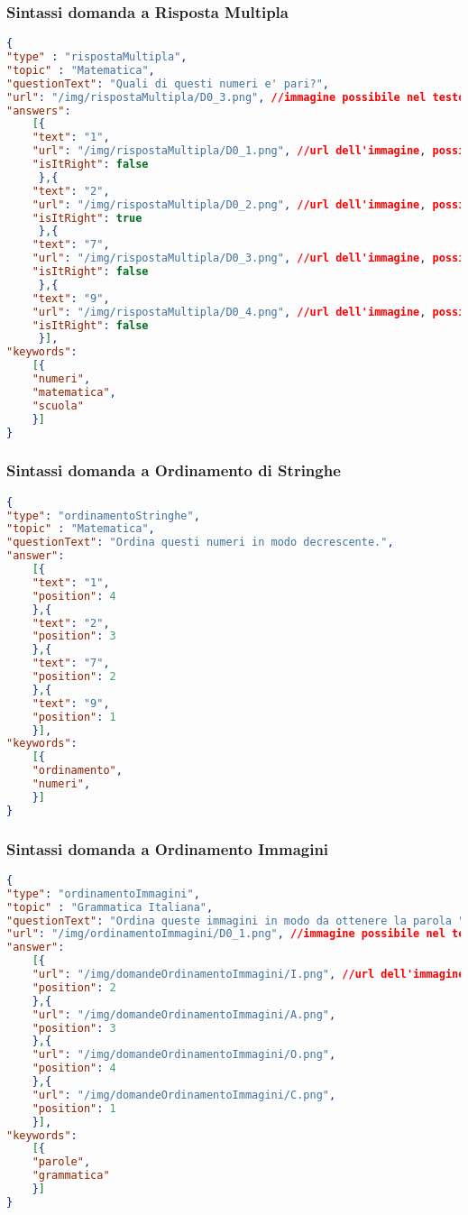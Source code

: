 \subsubsection{Sintassi domanda a Risposta Multipla}
\begin{lstlisting}[language=json,firstnumber=1]
{	
"type" : "rispostaMultipla",
"topic" : "Matematica",
"questionText": "Quali di questi numeri e' pari?",
"url": "/img/rispostaMultipla/D0_3.png", //immagine possibile nel testo della domanda risposta multipla
"answers":
	[{
	"text": "1",
	"url": "/img/rispostaMultipla/D0_1.png", //url dell'immagine, possibile campo facoltativo
	"isItRight": false
	 },{
	"text": "2",
	"url": "/img/rispostaMultipla/D0_2.png", //url dell'immagine, possibile campo facoltativo
	"isItRight": true
	 },{
	"text": "7",
	"url": "/img/rispostaMultipla/D0_3.png", //url dell'immagine, possibile campo facoltativo
	"isItRight": false
	 },{
	"text": "9",
	"url": "/img/rispostaMultipla/D0_4.png", //url dell'immagine, possibile campo facoltativo
	"isItRight": false
	 }],
"keywords":
	[{
	"numeri",
	"matematica",
	"scuola"
	}]
}
\end{lstlisting}

\subsubsection{Sintassi domanda a Ordinamento di Stringhe}
\begin{lstlisting}[language=json,firstnumber=1]
{
"type": "ordinamentoStringhe",
"topic" : "Matematica",
"questionText": "Ordina questi numeri in modo decrescente.",
"answer":
	[{
	"text": "1",
	"position": 4
	},{
	"text": "2",
	"position": 3
	},{
	"text": "7",
	"position": 2
	},{
	"text": "9",
	"position": 1
	}],
"keywords":
	[{
	"ordinamento",
	"numeri",
	}]
}
\end{lstlisting}

\subsubsection{Sintassi domanda a Ordinamento Immagini}
\begin{lstlisting}[language=json,firstnumber=1]
{
"type": "ordinamentoImmagini",
"topic" : "Grammatica Italiana",
"questionText": "Ordina queste immagini in modo da ottenere la parola "CIAO".",
"url": "/img/ordinamentoImmagini/D0_1.png", //immagine possibile nel testo della domanda ad ordianamento di immagini
"answer":
	[{
	"url": "/img/domandeOrdinamentoImmagini/I.png", //url dell'immagine
	"position": 2
	},{
	"url": "/img/domandeOrdinamentoImmagini/A.png",
	"position": 3
	},{
	"url": "/img/domandeOrdinamentoImmagini/O.png",
	"position": 4
	},{
	"url": "/img/domandeOrdinamentoImmagini/C.png",
	"position": 1
	}],
"keywords":
	[{
	"parole",
	"grammatica"
	}]
}
\end{lstlisting}

